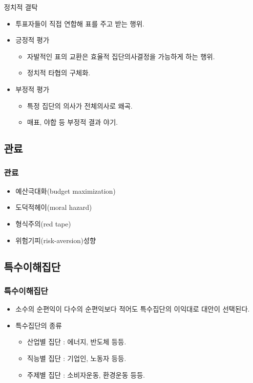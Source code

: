 \documentclass[aspectratio=169,xcolor=dvipsnames,handout]{beamer}
\begin{document}
\begin{frame}{정치적 결탁}
    \begin{itemize}
        \item 투표자들이 직접 연합해 표를 주고 받는 행위.
        \item 긍정적 평가
        \begin{itemize}
            \item 자발적인 표의 교환은 효율적 집단의사결정을 가능하게 하는 행위.
            \item 정치적 타협의 구체화.
        \end{itemize}
        \item 부정적 평가
        \begin{itemize}
            \item 특정 집단의 의사가 전체의사로 왜곡.
            \item 매표, 야합 등 부정적 결과 야기.
        \end{itemize}
    \end{itemize}
\end{frame}
\subsection{관료}

\begin{frame}[<+->]
\frametitle{관료}
    \begin{itemize}
        \item 예산극대화(budget maximization)
        \item 도덕적헤이(moral hazard)
        \item 형식주의(red tape)
        \item 위험기피(risk-aversion)성향
    \end{itemize}
\end{frame}
\subsection{특수이해집단}

\begin{frame}[<+->]
\frametitle{특수이해집단}
    \begin{itemize}
        \item 소수의 순편익이 다수의 순편익보다 적어도 특수집단의 이익대로 대안이 선택된다.
        \item 특수집단의 종류
        \begin{itemize}
            \item 산업별 집단 : 에너지, 반도체 등등.
            \item 직능별 집단 : 기업인, 노동자 등등.
            \item 주제별 집단 : 소비자운동, 환경운동 등등.
        \end{itemize}
    \end{itemize}
    
\end{frame}
\end{document}
